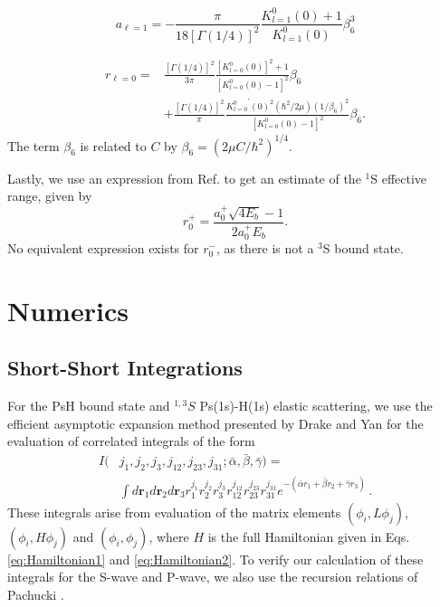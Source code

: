 \documentclass[reprint,showpacs,preprintnumbers,amsmath,amssymb,pra,aps]{revtex4-1}
\newcommand{\todoi}{\todo[inline]}
\begin{document}
\begin{equation}
\label{eq:GaoScatLenP}
a_{\ell=1} = -\frac{\pi}{18[\Gamma(1/4)]^2} \frac{K_{l=1}^0(0) + 1}{K_{l=1}^0(0)} \beta_6^3
\end{equation}

\begin{align}
\label{eq:GaoEffRange}
r_{\ell=0} = &\frac{[\Gamma(1/4)]^2}{3\pi} \frac{[K_{l=0}^0(0)]^2 + 1}{[K_{l=0}^0(0) - 1]^2} \beta_6 \nonumber \\
&+ \frac{[\Gamma(1/4)]^2}{\pi} \frac{{K_{l=0}^0}^\prime(0)^2(\hbar^2/2\mu)(1/\beta_6)^2}{[K_{l=0}^0(0) - 1]^2} \beta_6.
\end{align}
The term $\beta_6$ is related to $C$ by $\beta_6 = (2\mu C/\hbar^2)^{1/4}$.

Lastly, we use an expression from Ref. \cite{Blackwood2002} to get an estimate of the $^1$S effective range, given by
\begin{equation}
\label{eq:BlackwoodERT}
r_0^+ = \frac{a_0^+ \sqrt{4 E_b} - 1}{2 a_0^+ E_b}.
\end{equation}
No equivalent expression exists for $r_0^-$, as there is not a $^3$S bound state.


\section{Numerics}
\label{sec:Numerical}

\subsection{Short-Short Integrations}
\label{sec:ShortInt}
For the PsH bound state and $^{1,3}S$ Ps(1s)-H(1s) elastic scattering, we use the efficient asymptotic expansion method presented by Drake and Yan \cite{Drake1995} for the evaluation of correlated integrals of the form
\begin{align}
\label{eq:ShortInt}
I(&j_1,j_2,j_3,j_{12},j_{23},j_{31}; \bar{\alpha}, \bar{\beta}, \bar{\gamma}) =  \nonumber \\
&\int
d \textbf{r}_1 d \textbf{r}_2 d \textbf{r}_3
r_1^{j_1} r_2^{j_2} r_3^{j_3} r_{12}^{j_{12}}
r_{23}^{j_{23}} r_{31}^{j_{31}}
e^{-(\bar{\alpha} r_1 + \bar{\beta} r_2 + \bar{\gamma} r_3)}\, .
\end{align}
These integrals arise from evaluation of the matrix elements $(\phi_i, L \phi_j)$, $(\phi_i, H \phi_j)$ and $(\phi_i, \phi_j)$, where $H$ is the full Hamiltonian given in Eqs. \ref{eq:Hamiltonian1} and \ref{eq:Hamiltonian2}. To verify our calculation of these integrals for the S-wave and P-wave, we also use the recursion relations of Pachucki \cite{Pachucki2004}.
\end{document}
